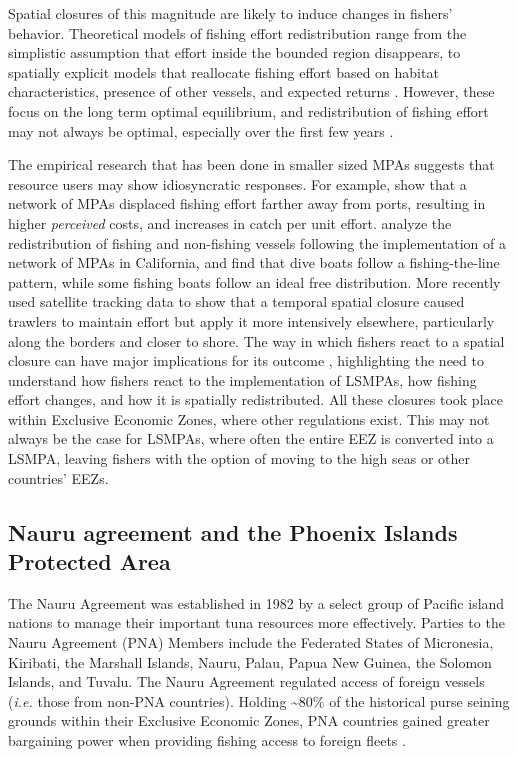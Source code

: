 \documentclass[9pttwoside,lineno]{pnas-new}
\begin{document}
Spatial closures of this magnitude are likely to induce changes in
fishers' behavior. Theoretical models of fishing effort redistribution
range from the simplistic assumption that effort inside the bounded
region disappears, to spatially explicit models that reallocate fishing
effort based on habitat characteristics, presence of other vessels, and
expected returns \citep{smith_2003,hilborn_2006}. However, these focus
on the long term optimal equilibrium, and redistribution of fishing
effort may not always be optimal, especially over the first few years
\citep{stevenson_2013}.

The empirical research that has been done in smaller sized MPAs
suggests that resource users may show idiosyncratic responses. For
example, \citet{stevenson_2013} show that a network of MPAs displaced
fishing effort farther away from ports, resulting in higher
\emph{perceived} costs, and increases in catch per unit effort.
\citet{cabral_2017} analyze the redistribution of fishing and
non-fishing vessels following the implementation of a network of MPAs in
California, and find that dive boats follow a
fishing-the-line pattern, while some fishing boats follow an ideal free
distribution. More recently \citet{elahi_2018} used satellite tracking
data to show that a temporal spatial closure caused trawlers to maintain
effort but apply it more intensively elsewhere, particularly along the
borders and closer to shore. The way in which fishers react to a spatial
closure can have major implications for its outcome
\citep{smith_2003,hilborn_2006}, highlighting the need to understand how
fishers react to the implementation of LSMPAs, how fishing effort
changes, and how it is spatially redistributed. All these closures took
place within Exclusive Economic Zones, where other regulations exist.
This may not always be the case for LSMPAs, where often the entire EEZ
is converted into a LSMPA, leaving fishers with the option of moving to
the high seas or other countries' EEZs.

\hypertarget{nauru-agreement-and-the-phoenix-island-protected-area}{%
\subsection{Nauru agreement and the Phoenix Islands Protected
Area}\label{nauru-agreement-and-the-phoenix-island-protected-area}}

The Nauru Agreement was established in 1982 by a select group of Pacific
island nations to manage their important tuna resources more effectively. Parties to the Nauru Agreement (PNA) Members
include the Federated States of Micronesia, Kiribati, the Marshall Islands,
Nauru, Palau, Papua New Guinea, the Solomon Islands, and Tuvalu. The Nauru
Agreement regulated access of foreign vessels (\emph{i.e.} those from
non-PNA countries). Holding \textasciitilde{}80\% of the historical
purse seining grounds within their Exclusive Economic Zones, PNA
countries gained greater bargaining power when providing fishing access to foreign
fleets \citep{havice_2010}.
\end{document}
